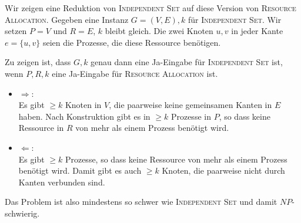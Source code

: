 \documentclass[a4paper]{scrartcl}
\begin{document}
\begin{enumerate}[label=\bfseries \arabic*.]
\begin{enumerate}
        Wir zeigen eine Reduktion von \textsc{Independent Set} auf diese
        Version von \textsc{Resource Allocation}.
        Gegeben eine Instanz $G = (V,E), k$ für \textsc{Independent Set}.
        Wir setzen $P = V$ und $R = E$, $k$ bleibt gleich.
        Die zwei Knoten $u,v$ in jeder Kante $e = \{u,v\}$ seien die Prozesse,
        die diese Ressource benötigen.

        Zu zeigen ist, dass $G,k$ genau dann eine Ja-Eingabe für
        \textsc{Independent Set} ist, wenn $P,R,k$ eine Ja-Eingabe für
        \textsc{Resource Allocation} ist.
        \begin{itemize}
            \item $\Rightarrow$: \\
                Es gibt $\geq k$ Knoten in $V$, die paarweise keine gemeinsamen
                Kanten in $E$ haben.
                Nach Konstruktion gibt es in $\geq k$ Prozesse in $P$, so dass
                keine Ressource in $R$ von mehr als einem Prozess benötigt
                wird.
            \item $\Leftarrow$: \\
                Es gibt $\geq k$ Prozesse, so dass keine Ressource von mehr als
                einem Prozess benötigt wird.
                Damit gibt es auch $\geq k$ Knoten, die paarweise nicht durch
                Kanten verbunden sind.
        \end{itemize}
        Das Problem ist also mindestens so schwer wie \textsc{Independent Set}
        und damit $NP$-schwierig.

\end{enumerate}


\end{enumerate}
\end{document}
